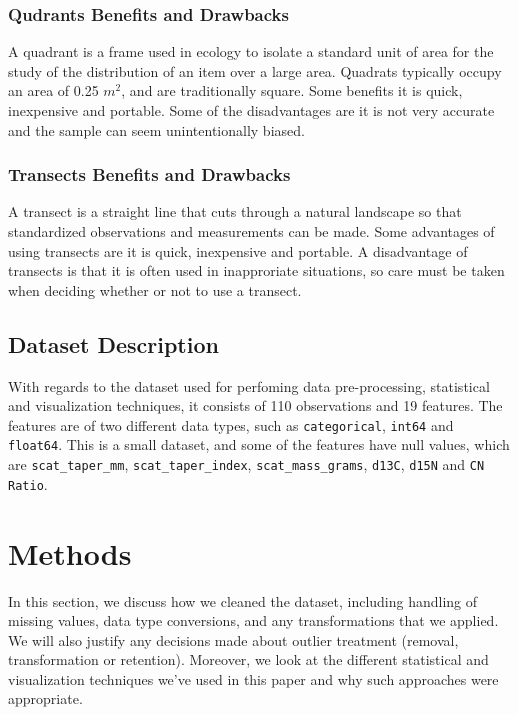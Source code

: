 \documentclass[a4paper]{article}
\begin{document}
\subsubsection{Qudrants Benefits and Drawbacks}
A quadrant is a frame used in ecology to isolate a standard unit of area for the study of the distribution of an item over a large area. Quadrats typically 
occupy an area of 0.25 $m^2$, and are traditionally square. Some benefits it is quick, inexpensive and portable. Some of the disadvantages are it is not 
very accurate and the sample can seem unintentionally biased.

\subsubsection{Transects Benefits and Drawbacks}
A transect is a straight line that cuts through a natural landscape so that standardized observations and measurements can be made. Some advantages of using
transects are it is quick, inexpensive and portable. A disadvantage of transects is that it is often used in inapproriate situations, so care must be taken 
when deciding whether or not to use a transect.

\subsection{Dataset Description}
With regards to the dataset used for perfoming data pre-processing, statistical and visualization techniques, it consists of 110 observations and 19 features.
The features are of two different data types, such as \texttt{categorical}, \texttt{int64} and \texttt{float64}. This is a small dataset, and some of the 
features have null values, which are \texttt{scat\_taper\_mm}, \texttt{scat\_taper\_index}, \texttt{scat\_mass\_grams}, \texttt{d13C}, \texttt{d15N} and 
\texttt{CN Ratio}.

\newpage

\section{Methods}
In this section, we discuss how we cleaned the dataset, including handling of missing values, data type conversions, and any transformations that we applied.
We will also justify any decisions made about outlier treatment (removal, transformation or retention). Moreover, we look at the different statistical and
visualization techniques we've used in this paper and why such approaches were appropriate.
\end{document}
